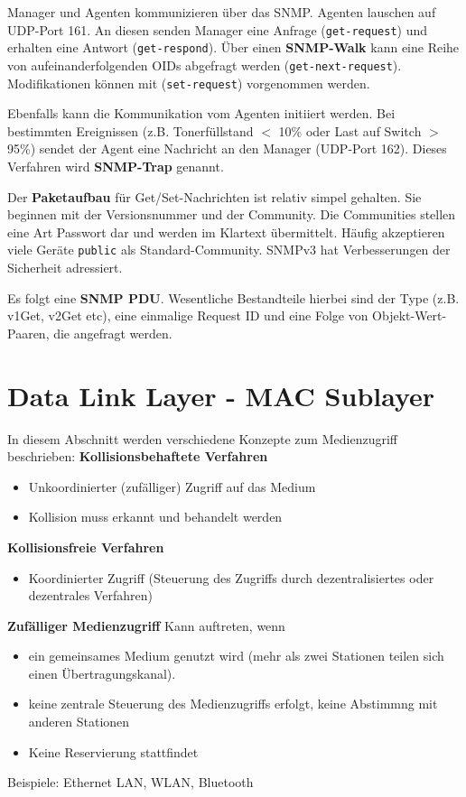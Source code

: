 \documentclass{article} %
\begin{document}
Manager und Agenten kommunizieren über das SNMP.
Agenten lauschen auf UDP-Port 161.
An diesen senden Manager eine Anfrage (\texttt{get-request}) und erhalten eine Antwort (\texttt{get-respond}).
Über einen \textbf{SNMP-Walk} kann eine Reihe von aufeinanderfolgenden OIDs abgefragt werden (\texttt{get-next-request}).
Modifikationen können mit (\texttt{set-request}) vorgenommen werden.

Ebenfalls kann die Kommunikation vom Agenten initiiert werden.
Bei bestimmten Ereignissen (z.B. Tonerfüllstand $<$ 10\% oder Last auf Switch $>$ 95\%) sendet der Agent eine Nachricht an den Manager (UDP-Port 162).
Dieses Verfahren wird \textbf{SNMP-Trap} genannt.

Der \textbf{Paketaufbau} für Get/Set-Nachrichten ist relativ simpel gehalten.
Sie beginnen mit der Versionsnummer und der Community.
Die Communities stellen eine Art Passwort dar und werden im Klartext übermittelt.
Häufig akzeptieren viele Geräte \texttt{public} als Standard-Community.
SNMPv3 hat Verbesserungen der Sicherheit adressiert.

Es folgt eine \textbf{SNMP PDU}.
Wesentliche Bestandteile hierbei sind der Type (z.B. v1Get, v2Get etc), eine einmalige Request ID und eine Folge von Objekt-Wert-Paaren, die angefragt werden.
\section{Data Link Layer - MAC Sublayer}
In diesem Abschnitt werden verschiedene Konzepte zum Medienzugriff beschrieben:
\textbf{Kollisionsbehaftete Verfahren}
	\begin{itemize}
	\item Unkoordinierter (zufälliger) Zugriff auf das Medium 
	\item Kollision muss erkannt und behandelt werden		
	\end{itemize} 
\textbf{Kollisionsfreie Verfahren}
	\begin{itemize}
	\item Koordinierter Zugriff (Steuerung des Zugriffs durch dezentralisiertes oder dezentrales Verfahren) 
	\end{itemize}
	
\textbf{Zufälliger Medienzugriff}
Kann auftreten, wenn 
	\begin{itemize}
	\item ein gemeinsames Medium genutzt wird (mehr als zwei Stationen teilen sich einen Übertragungskanal). 
	\item keine zentrale Steuerung des Medienzugriffs erfolgt, keine Abstimmng mit anderen Stationen 
	\item Keine Reservierung stattfindet
\end{itemize}
Beispiele: Ethernet LAN, WLAN, Bluetooth
\end{document}

